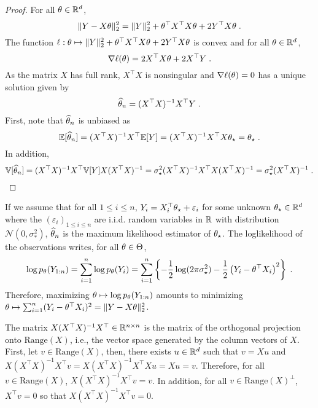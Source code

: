 \begin{proof}
For all $\theta\in\mathbb{R}^d$,
\[
 \|Y - X\theta\|_2^2 = \|Y\|_2^2 + \theta^\top X^\top X\theta + 2Y^\top X\theta\;.
\]
The function $\ell:\theta \mapsto\|Y\|_2^2 + \theta^\top X^\top X\theta + 2Y^\top X\theta$ is convex and for all $\theta\in\mathbb{R}^d$,
\[
\nabla \ell (\theta) = 2X^\top X\theta + 2 X^\top Y\;.
\]
As the matrix  $X$ has full rank, $X^\top X$ is nonsingular and $\nabla \ell (\theta) =0$ has a unique solution given by
\[
\widehat {\theta}_n = (X^\top X)^{-1}X^\top Y\;.
\]
First, note that $\widehat {\theta}_n$ is unbiased as
\[
\mathbb{E}[\widehat {\theta}_n] = (X^\top X)^{-1}X^\top \mathbb{E}[Y] = (X^\top X)^{-1}X^\top X\theta_{\star} = \theta_\star\;.
\]
In addition,
\[
\mathbb{V}[\widehat {\theta}_n] = (X^\top X)^{-1}X^\top\mathbb{V}[Y]X(X^\top X)^{-1}= \sigma_\star^2(X^\top X)^{-1}X^\top X(X^\top X)^{-1} = \sigma_\star^2(X^\top X)^{-1}\;.
\]
\end{proof}

\begin{remark}
If we assume that  for all $1\leqslant i \leqslant n$, $Y_i = X^\top_i \theta_{\star} + \varepsilon_i$ for some unknown $\theta_\star\in\mathbb{R}^d$ where the $(\varepsilon_i)_{1\leqslant i\leqslant n}$ are i.i.d. random variables in $\mathbb{R}$ with distribution $\mathcal{N}(0,\sigma_*^2)$, $\widehat {\theta}_n$ is the maximum likelihood estimator of $\theta_\star$. The loglikelihood of the observations writes, for all $\theta\in\Theta$,
$$
\log p_\theta(Y_{1:n}) = \sum_{i=1}^{n}\log p_\theta(Y_{i}) =  \sum_{i=1}^{n}\left\{- \frac{1}{2}\log(2\pi \sigma_\star^2) - \frac{1}{2}\left(Y_i - \theta^\top X_i\right)^2\right\}\;.
$$
Therefore, maximizing $\theta\mapsto \log p_\theta(Y_{1:n})$ amounts to minimizing $\theta \mapsto \sum_{i=1}^{n}(Y_i - \theta^\top X_i)^2 = \|Y - X\theta\|_2^2$.
\end{remark}

\begin{remark}
\label{reg:linear:projX}
The matrix $X(X^\top X)^{-1}X^\top \in\mathbb{R}^{n\times n}$ is the matrix of the orthogonal projection onto $\mathrm{Range}(X)$, i.e., the vector space generated by the column vectors of $X$. First, let $v \in \mathrm{Range}(X)$, then, there exists $u\in\mathbb{R}^d$ such that $v = Xu$ and $X(X^\top X)^{-1}X^\top v = X(X^\top X)^{-1}X^\top Xu = Xu = v$. Therefore, for all $v \in \mathrm{Range}(X)$, $X(X^\top X)^{-1}X^\top v=v$. In addition, for all $v\in \mathrm{Range}(X)^\perp$, $X^\top v = 0$ so that $X(X^\top X)^{-1}X^\top v = 0$. 
\end{remark}

